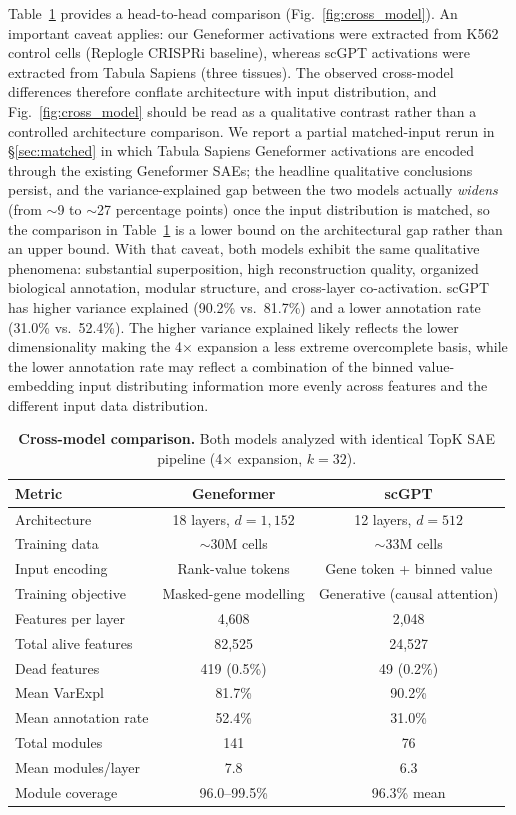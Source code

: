 \documentclass[onecolumn]{article}
\begin{document}
Table~\ref{tab:model_comparison} provides a head-to-head comparison (Fig.~\ref{fig:cross_model}). An important caveat applies: our Geneformer activations were extracted from K562 control cells (Replogle CRISPRi baseline), whereas scGPT activations were extracted from Tabula Sapiens (three tissues). The observed cross-model differences therefore conflate architecture with input distribution, and Fig.~\ref{fig:cross_model} should be read as a qualitative contrast rather than a controlled architecture comparison. We report a partial matched-input rerun in \S\ref{sec:matched} in which Tabula Sapiens Geneformer activations are encoded through the existing Geneformer SAEs; the headline qualitative conclusions persist, and the variance-explained gap between the two models actually \emph{widens} (from $\sim$9 to $\sim$27 percentage points) once the input distribution is matched, so the comparison in Table~\ref{tab:model_comparison} is a lower bound on the architectural gap rather than an upper bound. With that caveat, both models exhibit the same qualitative phenomena: substantial superposition, high reconstruction quality, organized biological annotation, modular structure, and cross-layer co-activation. scGPT has higher variance explained (90.2\% vs.\ 81.7\%) and a lower annotation rate (31.0\% vs.\ 52.4\%). The higher variance explained likely reflects the lower dimensionality making the 4$\times$ expansion a less extreme overcomplete basis, while the lower annotation rate may reflect a combination of the binned value-embedding input distributing information more evenly across features and the different input data distribution.

\begin{table}[t]
\centering
\caption{\textbf{Cross-model comparison.} Both models analyzed with identical TopK SAE pipeline (4$\times$ expansion, $k{=}32$).}
\label{tab:model_comparison}
\smallskip
\begin{tabular}{lcc}
\toprule
Metric & Geneformer & scGPT \\
\midrule
Architecture & 18 layers, $d{=}1{,}152$ & 12 layers, $d{=}512$ \\
Training data & $\sim$30M cells & $\sim$33M cells \\
Input encoding & Rank-value tokens & Gene token + binned value \\
Training objective & Masked-gene modelling & Generative (causal attention) \\
\midrule
Features per layer & 4,608 & 2,048 \\
Total alive features & 82,525 & 24,527 \\
Dead features & 419 (0.5\%) & 49 (0.2\%) \\
Mean VarExpl & 81.7\% & 90.2\% \\
Mean annotation rate & 52.4\% & 31.0\% \\
Total modules & 141 & 76 \\
Mean modules/layer & 7.8 & 6.3 \\
Module coverage & 96.0--99.5\% & 96.3\% mean \\
\bottomrule
\end{tabular}
\end{table}
\end{document}
